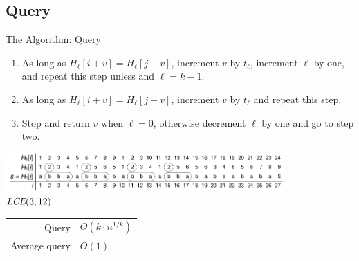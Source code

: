 \documentclass{beamer}
\begin{document}
\subsection{Query}
\begin{frame}{The \fprintk Algorithm: Query}
    \begin{enumerate}
        \item As long as $H_\ell[i+v] = H_\ell[j+v]$, increment $v$ by $t_\ell$, increment $\ell$ by one, and repeat this step unless and $\ell = k-1$.
        \item As long as $H_\ell[i+v] = H_\ell[j+v]$, increment $v$ by $t_\ell$ and repeat this step.
        \item Stop and return $v$ when $\ell = 0$, otherwise decrement $\ell$ by one and go to step two.
    \end{enumerate}
    \begin{center}
        \includegraphics[width=0.8\textwidth,page=2]{../doc/fingerprint.pdf}\\
         $\textit{LCE}(3,12)$
    \end{center}
    \begin{tabular}{r l}
        Query & $O(k\cdot n^{1/k})$ \\
        Average query & $O(1)$ \\
    \end{tabular}
\end{frame}
\end{document}
